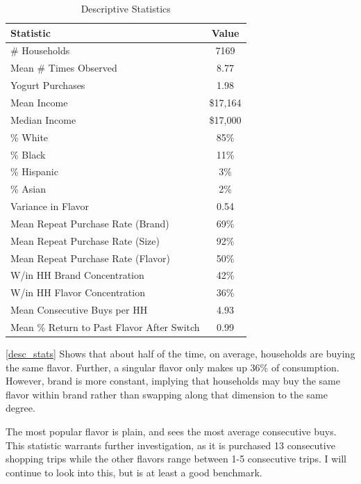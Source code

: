 \documentclass[11pt]{article}
\theoremstyle{definition}
\theoremstyle{remark}
\begin{document}
\begin{table}[htbp]
    \centering
    \caption{Descriptive Statistics}
    \label{tab:desc_stats}
    \begin{tabular}{lc}
        \toprule
        Statistic & Value \\
        \midrule
        \# Households               & 7169 \\
        Mean \# Times Observed      & 8.77 \\
        Yogurt Purchases            & 1.98 \\
        Mean Income                 & \$17,164 \\
        Median Income               & \$17,000 \\
        \% White                    & 85\% \\
        \% Black                    & 11\% \\
        \% Hispanic                 & 3\% \\
        \% Asian                    & 2\% \\
        Variance in Flavor          & 0.54 \\
        Mean Repeat Purchase Rate (Brand)   & 69\% \\
        Mean Repeat Purchase Rate (Size)    & 92\% \\
        Mean Repeat Purchase Rate (Flavor)  & 50\% \\
        W/in HH Brand Concentration & 42\% \\
        W/in HH Flavor Concentration& 36\% \\
        Mean Consecutive Buys per HH               & 4.93 \\
        Mean \% Return to Past Flavor After Switch & 0.99 \\
        \bottomrule
    \end{tabular}
\end{table}

\ref{desc_stats} Shows that about half of the time, on average, households are
buying the same flavor. Further, a singular flavor only makes up 36\% of
consumption. However, brand is more constant, implying that households may buy
the same flavor within brand rather than swapping along that dimension to the
same degree.

The most popular flavor is plain, and sees the most average consecutive buys.
This statistic warrants further investigation, as it is purchased 13 consecutive
shopping trips while the other flavors range between 1-5 consecutive trips. I
will continue to look into this, but is at least a good benchmark.
\end{document}
